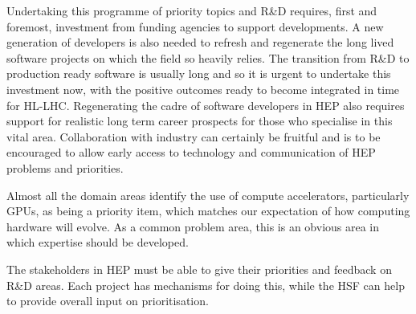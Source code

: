 \documentclass[10pt,a4paper]{article}
\begin{document}
Undertaking this programme of priority topics and R\&D requires, first
and foremost, investment from funding agencies to support developments.
A new generation of developers is also needed to refresh and regenerate
the long lived software projects on which the field so heavily relies.
The transition from R\&D to production ready software is usually long
and so it is urgent to undertake this investment now, with the positive
outcomes ready to become integrated in time for HL-LHC. Regenerating the
cadre of software developers in HEP also requires support for realistic
long term career prospects for those who specialise in this vital area.
Collaboration with industry can certainly be fruitful and is to be
encouraged to allow early access to technology and communication of HEP
problems and priorities.

Almost all the domain areas identify the use of compute accelerators,
particularly GPUs, as being a priority item, which matches our
expectation of how computing hardware will evolve. As a common problem
area, this is an obvious area in which expertise should be developed.

The stakeholders in HEP must be able to give their priorities and
feedback on R\&D areas. Each project has mechanisms for doing this,
while the HSF can help to provide overall input on prioritisation.
\end{document}
